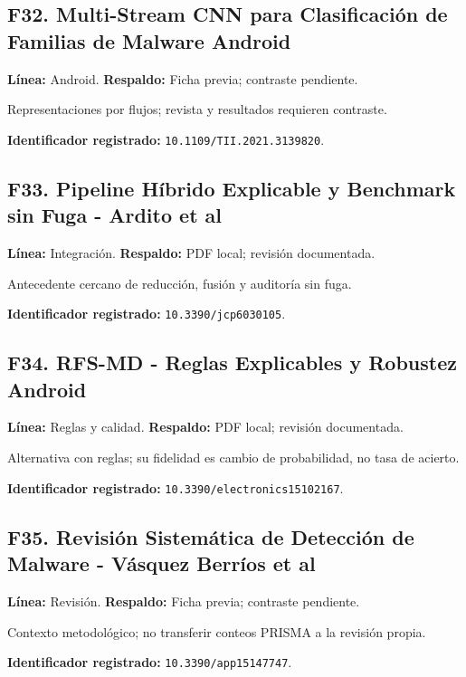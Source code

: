 \begin{samepage}
\subsection*{F32. Multi-Stream CNN para Clasificación de Familias de Malware Android}
\noindent\textbf{Línea:} Android. \textbf{Respaldo:} Ficha previa; contraste pendiente. 

Representaciones por flujos; revista y resultados requieren contraste.

\noindent\textbf{Identificador registrado:} \nolinkurl{10.1109/TII.2021.3139820}.

\end{samepage}
\begin{samepage}
\subsection*{F33. Pipeline Híbrido Explicable y Benchmark sin Fuga - Ardito et al}
\noindent\textbf{Línea:} Integración. \textbf{Respaldo:} PDF local; revisión documentada. \parencite{Ardito2026Hybrid}

Antecedente cercano de reducción, fusión y auditoría sin fuga.

\noindent\textbf{Identificador registrado:} \nolinkurl{10.3390/jcp6030105}.

\end{samepage}
\begin{samepage}
\subsection*{F34. RFS-MD - Reglas Explicables y Robustez Android}
\noindent\textbf{Línea:} Reglas y calidad. \textbf{Respaldo:} PDF local; revisión documentada. \parencite{Alhawari2026RFSMD}

Alternativa con reglas; su fidelidad es cambio de probabilidad, no tasa de acierto.

\noindent\textbf{Identificador registrado:} \nolinkurl{10.3390/electronics15102167}.

\end{samepage}
\begin{samepage}
\subsection*{F35. Revisión Sistemática de Detección de Malware - Vásquez Berríos et al}
\noindent\textbf{Línea:} Revisión. \textbf{Respaldo:} Ficha previa; contraste pendiente. 

Contexto metodológico; no transferir conteos PRISMA a la revisión propia.

\noindent\textbf{Identificador registrado:} \nolinkurl{10.3390/app15147747}.

\end{samepage}
